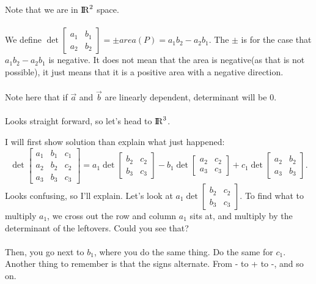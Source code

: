\documentclass[addpoints]{exam}
\begin{document}
Note that we are in ${\rm I\!R}^2$ space.\\\\
We define $\det\begin{bmatrix}a_1&b_1\\a_2&b_2\end{bmatrix}=\pm area(P) = a_1b_2-a_2b_1.$ The $\pm$ is for the case that $a_1b_2-a_2b_1$ is negative. It does not mean that the area is negative(as that is not possible), it just means that it is a positive area with a negative direction. \\\\Note here that if $\vec{a}$ and $\vec{b}$ are linearly dependent, determinant will be 0.
\\\\
Looks straight forward, so let's head to ${\rm I\!R}^3$.

I will first show solution than explain what just happened:
\[\det\begin{bmatrix}a_1&b_1&c_1\\a_2&b_2&c_2\\a_3&b_3&c_3\end{bmatrix}=a_1\det\begin{bmatrix}b_2&c_2\\b_3&c_3\end{bmatrix}-b_1\det\begin{bmatrix}a_2&c_2\\a_3&c_3\end{bmatrix}+c_1\det\begin{bmatrix}a_2&b_2\\a_3&b_3\end{bmatrix}.\]
Looks confusing, so I'll explain. Let's look at $a_1\det\begin{bmatrix}b_2&c_2\\b_3&c_3\end{bmatrix}.$ To find what to multiply $a_1$, we cross out the row and column $a_1$ sits at, and multiply by the determinant of the leftovers. Could you see that?\\\\

Then, you go next to $b_1$, where you do the same thing. Do the same for $c_1.$ Another thing to remember is that the signs alternate. From - to + to -, and so on. \\\\
\end{document}
